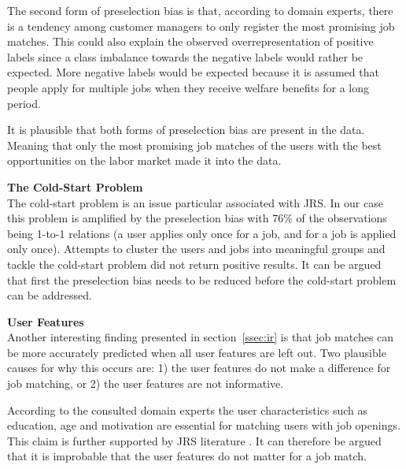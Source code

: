 The second form of preselection bias is that, according to domain experts, there is a tendency among customer managers to only register the most promising job matches.
This could also explain the observed overrepresentation of positive labels since a class imbalance towards the negative labels would rather be expected.
More negative labels would be expected because it is assumed that people apply for multiple jobs when they receive welfare benefits for a long period. 

It is plausible that both forms of preselection bias are present in the data.
Meaning that only the most promising job matches of the users with the best opportunities on the labor market made it into the data.

\noindent
\textbf{The Cold-Start Problem}\\
The cold-start problem is an issue particular associated with JRS. In our case this problem is amplified by the preselection bias with 76\% of the observations being 1-to-1 relations (a user applies only once for a job, and for a job is applied only once).
Attempts to cluster the users and jobs into meaningful groups and tackle the cold-start problem did not return positive results.
It can be argued that first the preselection bias needs to be reduced before the cold-start problem can be addressed. 


\noindent
\textbf{User Features}\\
Another interesting finding presented in section~\ref{ssec:ir} is that job matches can be more accurately predicted when all user features are left out.  
Two plausible causes for why this occurs are: 1) the user features do not make a difference for job matching, or 2) the user features are not informative.

According to the consulted domain experts the user characteristics such as education, age and motivation are essential for matching users with job openings. 
This claim is further supported by JRS literature \cite{kenthapadi2017personalized, T.Al-Otaibi2012ASystems, Zheng2012JobSurvey, hong2013job}.
It can therefore be argued that it is improbable that the user features do not matter for a job match. 


